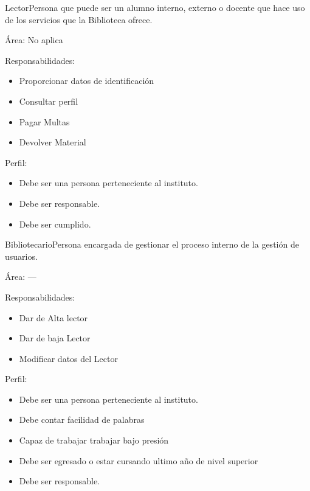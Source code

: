 \begin{Actor}{Lector}{Persona que puede ser un alumno interno, externo o docente que hace uso de los servicios que la Biblioteca ofrece.}
	\item[Área:] No aplica
	\item[Responsabilidades:] \hspace{1pt}
	\begin{itemize}
		\item Proporcionar datos de identificación
		\item Consultar perfil
		\item Pagar Multas
		\item Devolver Material
	\end{itemize}
	\item[Perfil:] \hspace{1pt}
	\begin{itemize}
		\item Debe ser una persona perteneciente al instituto. 		
		\item Debe ser responsable.
		\item Debe ser cumplido.
	\end{itemize}
\end{Actor}

\begin{Actor}{Bibliotecario}{Persona encargada de gestionar el proceso interno de la gestión de usuarios. }
	\item[Área:] ---
	\item[Responsabilidades:] \hspace{1pt}
	\begin{itemize}
		\item Dar de Alta lector
		\item Dar de baja Lector
		\item Modificar datos del Lector
			\end{itemize}
\item[Perfil:] \hspace{1pt}
	\begin{itemize}
	\item Debe ser una persona perteneciente al instituto.
		\item Debe contar facilidad de palabras
		\item Capaz de trabajar trabajar bajo presión 
		\item Debe ser egresado o estar cursando ultimo año de nivel superior 		
		\item Debe ser responsable.
	\end{itemize}
\end{Actor}




